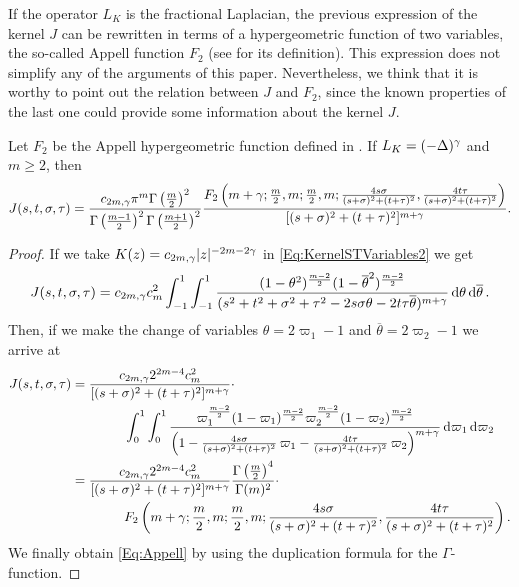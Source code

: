 If the operator $L_K$ is the fractional Laplacian, the previous expression of the kernel $J$ can be rewritten in terms of a hypergeometric function of two variables, the so-called Appell function $F_2$ (see \cite{Appell} for its definition). This expression does not simplify any of the arguments of this paper. Nevertheless, we think that it is worthy to point out the relation between $J$ and $F_2$, since the known properties of the last one could provide some information about the kernel $J$.

\begin{lemma}
\label{Lemma:Appell} Let $F_2$ be the Appell hypergeometric function defined in \cite{Appell}. If $L_K = (-\Delta)^\gamma$ and $m\geq 2$, then
\begin{equation}
\label{Eq:Appell}
J(s,t,\sigma,\tau) = \frac{c_{2m,\gamma}\pi^m\Gamma\left(\frac{m}{2}\right)^2}{\Gamma\left(\frac{m-1}{2}\right)^2\Gamma\left(\frac{m+1}{2}\right)^2} \frac{F_2\left( m+\gamma;\frac{m}{2},m;\frac{m}{2},m;\frac{4s\sigma}{(s+\sigma)^2+(t+\tau)^2},\frac{4t\tau}{(s+\sigma)^2+(t+\tau)^2} \right)}{[(s+\sigma)^2+(t+\tau)^2]^{m+\gamma}}.
\end{equation}
\end{lemma}



\begin{proof}
If we take $K(z) = c_{2m,\gamma}|z|^{-2m-2\gamma}$ in \eqref{Eq:KernelSTVariables2} we get
\begin{align*}
J(s,t,\sigma, \tau) = c_{2m,\gamma} c_m ^2  \int_{-1}^1  \int_{-1}^1  \frac{(1-\theta^2)^{\frac{m-2}{2}} (1-\overline{\theta}^2)^{\frac{m-2}{2}}}{(s^2 + t^2 + \sigma^2 + \tau^2 -2 s \sigma \theta -2 t \tau \overline{\theta})^{m+\gamma}} \,\mathrm{d} \theta \,\mathrm{d} \overline{\theta}\,.
\end{align*}
Then, if we make the change of variables $\theta = 2\varpi_1-1$ and $\overline{\theta}=2\varpi_2-1$
we arrive at
\begin{align*}
J(s,t,\sigma, \tau) &= \frac{ c_{2m,\gamma} 2^{2m-4} c_m^2}{[(s+\sigma)^2+(t+\tau)^2]^{m+\gamma}} \cdot \\
 & \quad \quad \quad \quad  \int_0^1 \int_0^1
\frac{ \varpi_1^\frac{m-2}{2} (1-\varpi_1)^\frac{m-2}{2} \varpi_2^\frac{m-2}{2}
(1-\varpi_2)^\frac{m-2}{2}}{\left(1-\frac{4s\sigma}{(s+\sigma)^2+(t+\tau)^2}\,\varpi_1-\frac{4t\tau}{(s+\sigma)^2+(t+\tau)^2}\,\varpi_2
\right)^{m+\gamma}} \,\mathrm{d} \varpi_1 \,\mathrm{d} \varpi_2 \\
&= \frac{ c_{2m,\gamma} 2^{2m-4} c_m^2}{[(s+\sigma)^2+(t+\tau)^2]^{m+\gamma}} \frac{\Gamma\left(\frac{m}{2} \right)^4}{\Gamma(m)^2} \cdot \\
& \quad \quad \quad \quad F_2\left( m+\gamma;\frac{m}{2},m;\frac{m}{2},m;\frac{4s\sigma}{(s+\sigma)^2+(t+\tau)^2},\frac{4t\tau}{(s+\sigma)^2+(t+\tau)^2} \right).
\end{align*}
We finally obtain \eqref{Eq:Appell} by using the duplication formula for the $\Gamma$-function.
\end{proof}

